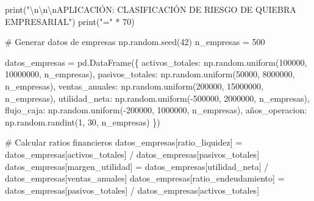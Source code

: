\documentclass[
  doc,
  floatsintext,
  longtable,
  a4paper,
  nolmodern,
  notxfonts,
  notimes,
  12pt,
  colorlinks=true,linkcolor=blue,citecolor=blue,urlcolor=blue]{apa7}
\newenvironment{Shaded}{\begin{snugshade}}{\end{snugshade}}
\newcommand{\BuiltInTok}[1]{\textcolor[rgb]{0.00,0.23,0.31}{#1}}
\newcommand{\CharTok}[1]{\textcolor[rgb]{0.13,0.47,0.30}{#1}}
\newcommand{\CommentTok}[1]{\textcolor[rgb]{0.37,0.37,0.37}{#1}}
\newcommand{\DecValTok}[1]{\textcolor[rgb]{0.68,0.00,0.00}{#1}}
\newcommand{\NormalTok}[1]{\textcolor[rgb]{0.00,0.23,0.31}{#1}}
\newcommand{\OperatorTok}[1]{\textcolor[rgb]{0.37,0.37,0.37}{#1}}
\newcommand{\StringTok}[1]{\textcolor[rgb]{0.13,0.47,0.30}{#1}}
\begin{document}
\begin{Shaded}
\begin{Highlighting}[]
\BuiltInTok{print}\NormalTok{(}\StringTok{"}\CharTok{\textbackslash{}n\textbackslash{}n\textbackslash{}n}\StringTok{APLICACIÓN: CLASIFICACIÓN DE RIESGO DE QUIEBRA EMPRESARIAL"}\NormalTok{)}
\BuiltInTok{print}\NormalTok{(}\StringTok{"="} \OperatorTok{*} \DecValTok{70}\NormalTok{)}

\CommentTok{\# Generar datos de empresas}
\NormalTok{np.random.seed(}\DecValTok{42}\NormalTok{)}
\NormalTok{n\_empresas }\OperatorTok{=} \DecValTok{500}

\NormalTok{datos\_empresas }\OperatorTok{=}\NormalTok{ pd.DataFrame(\{}
    \StringTok{\textquotesingle{}activos\_totales\textquotesingle{}}\NormalTok{: np.random.uniform(}\DecValTok{100000}\NormalTok{, }\DecValTok{10000000}\NormalTok{, n\_empresas),}
    \StringTok{\textquotesingle{}pasivos\_totales\textquotesingle{}}\NormalTok{: np.random.uniform(}\DecValTok{50000}\NormalTok{, }\DecValTok{8000000}\NormalTok{, n\_empresas),}
    \StringTok{\textquotesingle{}ventas\_anuales\textquotesingle{}}\NormalTok{: np.random.uniform(}\DecValTok{200000}\NormalTok{, }\DecValTok{15000000}\NormalTok{, n\_empresas),}
    \StringTok{\textquotesingle{}utilidad\_neta\textquotesingle{}}\NormalTok{: np.random.uniform(}\OperatorTok{{-}}\DecValTok{500000}\NormalTok{, }\DecValTok{2000000}\NormalTok{, n\_empresas),}
    \StringTok{\textquotesingle{}flujo\_caja\textquotesingle{}}\NormalTok{: np.random.uniform(}\OperatorTok{{-}}\DecValTok{200000}\NormalTok{, }\DecValTok{1000000}\NormalTok{, n\_empresas),}
    \StringTok{\textquotesingle{}años\_operacion\textquotesingle{}}\NormalTok{: np.random.randint(}\DecValTok{1}\NormalTok{, }\DecValTok{30}\NormalTok{, n\_empresas)}
\NormalTok{\})}

\CommentTok{\# Calcular ratios financieros}
\NormalTok{datos\_empresas[}\StringTok{\textquotesingle{}ratio\_liquidez\textquotesingle{}}\NormalTok{] }\OperatorTok{=}\NormalTok{ datos\_empresas[}\StringTok{\textquotesingle{}activos\_totales\textquotesingle{}}\NormalTok{] }\OperatorTok{/}\NormalTok{ datos\_empresas[}\StringTok{\textquotesingle{}pasivos\_totales\textquotesingle{}}\NormalTok{]}
\NormalTok{datos\_empresas[}\StringTok{\textquotesingle{}margen\_utilidad\textquotesingle{}}\NormalTok{] }\OperatorTok{=}\NormalTok{ datos\_empresas[}\StringTok{\textquotesingle{}utilidad\_neta\textquotesingle{}}\NormalTok{] }\OperatorTok{/}\NormalTok{ datos\_empresas[}\StringTok{\textquotesingle{}ventas\_anuales\textquotesingle{}}\NormalTok{]}
\NormalTok{datos\_empresas[}\StringTok{\textquotesingle{}ratio\_endeudamiento\textquotesingle{}}\NormalTok{] }\OperatorTok{=}\NormalTok{ datos\_empresas[}\StringTok{\textquotesingle{}pasivos\_totales\textquotesingle{}}\NormalTok{] }\OperatorTok{/}\NormalTok{ datos\_empresas[}\StringTok{\textquotesingle{}activos\_totales\textquotesingle{}}\NormalTok{]}


\end{Highlighting}
\end{Shaded}
\end{document}
